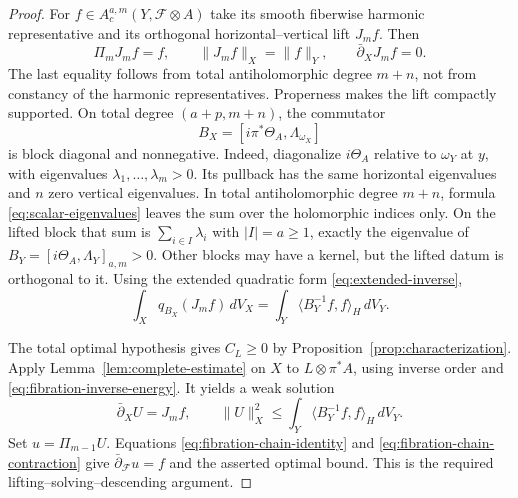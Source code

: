 \documentclass[11pt,reqno]{amsart}
\numberwithin{equation}{section}
\theoremstyle{definition}
\theoremstyle{remark}
\newcommand{\db}{\bar\partial}
\newcommand{\cF}{\mathcal F}
\newcommand{\ip}[2]{\langle #1,#2\rangle}
\begin{document}
\begin{proof}
For $f\in A_c^{a,m}(Y,\cF\otimes A)$ take its smooth fiberwise harmonic representative and its orthogonal horizontal--vertical lift $J_mf$. Then
\[
 \Pi_mJ_mf=f,\qquad \|J_mf\|_X=\|f\|_Y,
 \qquad \db_XJ_mf=0.
\]
The last equality follows from total antiholomorphic degree $m+n$, not from constancy of the harmonic representatives. Properness makes the lift compactly supported. On total degree $(a+p,m+n)$, the commutator
\[
 B_X=[i\pi^*\Theta_A,\Lambda_{\omega_X}]
\]
is block diagonal and nonnegative. Indeed, diagonalize $i\Theta_A$ relative to $\omega_Y$ at $y$, with eigenvalues $\lambda_1,\ldots,\lambda_m>0$. Its pullback has the same horizontal eigenvalues and $n$ zero vertical eigenvalues. In total antiholomorphic degree $m+n$, formula \eqref{eq:scalar-eigenvalues} leaves the sum over the holomorphic indices only. On the lifted block that sum is $\sum_{i\in I}\lambda_i$ with $|I|=a\geq1$, exactly the eigenvalue of $B_Y=[i\Theta_A,\Lambda_Y]_{a,m}>0$. Other blocks may have a kernel, but the lifted datum is orthogonal to it. Using the extended quadratic form \eqref{eq:extended-inverse},
\begin{equation}\label{eq:fibration-inverse-energy}
 \int_X q_{B_X}(J_mf)\,dV_X
       =\int_Y\ip{B_Y^{-1}f}{f}_H\,dV_Y.
\end{equation}

The total optimal hypothesis gives $C_L\geq0$ by Proposition~\ref{prop:characterization}. Apply Lemma~\ref{lem:complete-estimate} on $X$ to $L\otimes\pi^*A$, using inverse order and \eqref{eq:fibration-inverse-energy}. It yields a weak solution
\[
 \db_XU=J_mf,\qquad
 \|U\|_X^2\leq\int_Y\ip{B_Y^{-1}f}{f}_H\,dV_Y.
\]
Set $u=\Pi_{m-1}U$. Equations \eqref{eq:fibration-chain-identity} and \eqref{eq:fibration-chain-contraction} give $\db_{\cF}u=f$ and the asserted optimal bound. This is the required lifting--solving--descending argument.
\end{proof}
\end{document}
